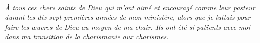 \newpage
\mbox{}
\vfill
\parbox{4in}{
\begin{center}
\HRule \\[0.4cm]
\emph{À tous ces chers saints de Dieu qui m’ont aimé et encouragé comme leur
 pasteur durant les dix-sept premières années de mon ministère, alors que je
 luttais pour faire les œuvres de Dieu au moyen de ma chair. Ils ont été
 si patients avec moi dans ma transition de la \emph{charismanie}
 aux \emph{charismes}.}
\HRule \\[1.5cm]
\end{center}
}
\vfill
\mbox{}
\newpage

